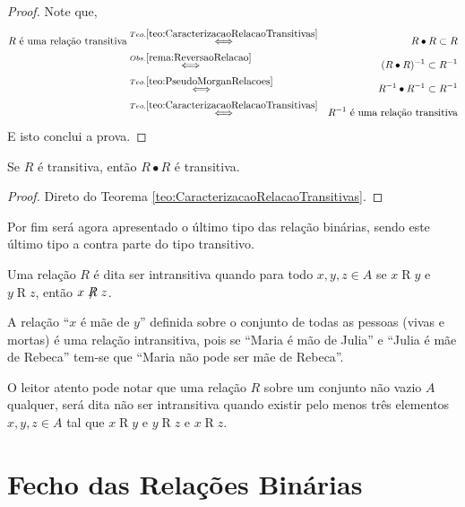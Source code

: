 \begin{proof}
	Note que,
	\begin{eqnarray*}
		R \text{ é uma relação transitiva} & \stackrel{Teo. \ref{teo:CaracterizacaoRelacaoTransitivas}}{\Longleftrightarrow }& R \bullet R \subset R\\
		& \stackrel{Obs. \ref{rema:ReversaoRelacao}}{\Longleftrightarrow} & (R \bullet R)^{-1} \subset R^{-1}\\
		& \stackrel{Teo. \ref{teo:PseudoMorganRelacoes}}{\Longleftrightarrow} & R^{-1} \bullet R^{-1} \subset R^{-1}\\
		&  \stackrel{Teo. \ref{teo:CaracterizacaoRelacaoTransitivas}}{\Longleftrightarrow } & R^{-1} \text{ é uma relação transitiva}
	\end{eqnarray*}
	E isto conclui a prova.
\end{proof}

\begin{theorem}
	Se $R$ é transitiva, então $R \bullet R$ é transitiva.
\end{theorem}

\begin{proof}
	Direto do Teorema \ref{teo:CaracterizacaoRelacaoTransitivas}.
\end{proof}

Por fim será agora apresentado o último tipo das relação binárias, sendo este último tipo a contra parte do tipo transitivo.

\begin{definition}\label{def::RelacaoIntransitiva}
	Uma relação $R$ é dita ser intransitiva quando para todo $x, y, z \in A$ se $x \mathrel{R} y$ e $y \mathrel{R} z$, então $x \centernot{R} z$.
\end{definition}

\begin{example}
	A relação ``$x$ é mãe de $y$'' definida sobre o conjunto de todas as pessoas (vivas e mortas) é uma relação intransitiva, pois se ``Maria é mão de Julia'' e ``Julia é mãe de Rebeca'' tem-se que ``Maria não pode ser mãe de Rebeca''.
\end{example}

O leitor atento pode notar que uma relação $R$ sobre um conjunto não vazio $A$ qualquer, será dita não ser intransitiva quando existir pelo menos três elementos $x, y, z \in A$ tal que $x \mathrel{R} y$ e $y \mathrel{R} z$ e $x \mathrel{R} z$.

\section{Fecho das Relações Binárias}\label{sec:FechoDasRelacoesBinarias}


